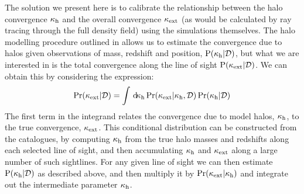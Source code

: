 \documentclass[useAMS,usenatbib,a4paper]{mn2e}
\begin{document}
The solution we present here is to calibrate the relationship between the halo
convergence $\kappa_{\rm h}$ and the overall convergence $\kappa_{\rm ext}$ (as would be
calculated by ray tracing through the full density field)  using the
simulations themselves. The halo modelling procedure outlined in
 allows  us to estimate  the convergence due to halos
given observations of  mass, redshift and position,
${\rm P}(\kappa_{\rm h}|{\mathcal{D}})$, but what we are interested in is the total
convergence along the line of sight ${\rm P}(\kappa_{\rm ext}|{\mathcal{D}})$. We can obtain
this by considering the expression: 
\begin{equation} 
\Pr(\kappa_{\rm ext}|{\mathcal{D}}) = 
   \int \, \mathrm{d} \!\kappa_{\rm h}  \Pr(\kappa_{\rm ext}|\kappa_{\rm h},{\mathcal{D}}) \Pr(\kappa_{\rm h}|{\mathcal{D}})
   \label{eq:kappaconv}
\end{equation} 
The first term in the integrand relates the convergence due to model halos,
$\kappa_{\rm h}$, to the true convergence, $\kappa_{\rm ext}$. This conditional distribution
can be constructed from the \MS catalogues, by computing
$\kappa_{\rm h}$ from the true halo masses and redshifts 
along each selected line of sight, and then
accumulating $\kappa_{\rm h}$ and $\kappa_{\rm ext}$
along a large number of such sightlines. 
For any given line of sight we can then estimate
${\rm P}(\kappa_{\rm h}|{\mathcal{D}})$ as described above, and then multiply it by
$\Pr(\kappa_{\rm ext}|\kappa_{\rm h})$ and integrate out the intermediate parameter
$\kappa_{\rm h}$. 

\end{document}
